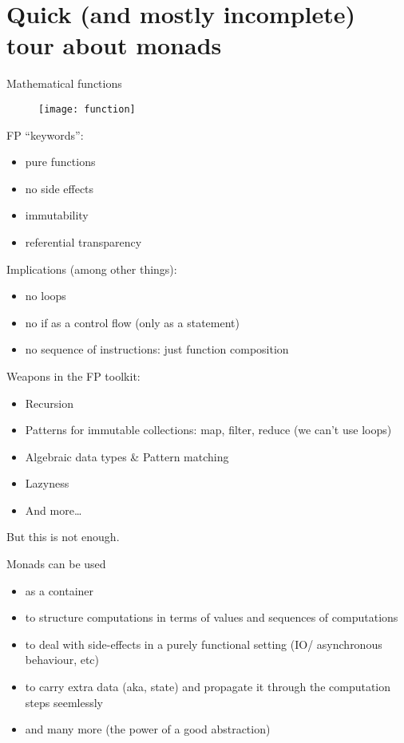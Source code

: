\documentclass[10pt]{beamer}
\begin{document}
\section{Quick (and mostly incomplete) tour about monads}
\begin{frame}{Mathematical functions}
	\begin{figure}
		\centering
		\texttt{[image: function]}
	\end{figure}
\end{frame}
\begin{frame}
	FP ``keywords'':
	\begin{itemize}
		\item pure functions 
		\item no side effects 
		\item immutability
		\item referential transparency 
	\end{itemize}

	Implications (among other things):
	\begin{itemize}
		\item no loops
		\item no if as a control flow (only as a statement)
		\item no sequence of instructions: just function composition
	\end{itemize}

\end{frame}
\begin{frame}
	Weapons in the FP toolkit:
	\begin{itemize}
		\item Recursion 
		\item Patterns for immutable collections: map, filter, reduce  (we can't use loops)
		\item Algebraic data types \& Pattern matching
		\item Lazyness
		\item And more\ldots 
	\end{itemize}
	But this is not enough. 
\end{frame}
\begin{frame}
Monads can be used 
	\begin{itemize}
		\item as a container 
		\item 
		to structure computations in terms of values and sequences of computations		
	\item to deal with side-effects in a purely functional setting (IO/ asynchronous behaviour, etc) 
 \item  to carry extra data (aka, state) and propagate it through the computation  steps seemlessly 
 \item and many more 
	(the power of a good abstraction)
	\end{itemize}
\end{frame}
\end{document}
